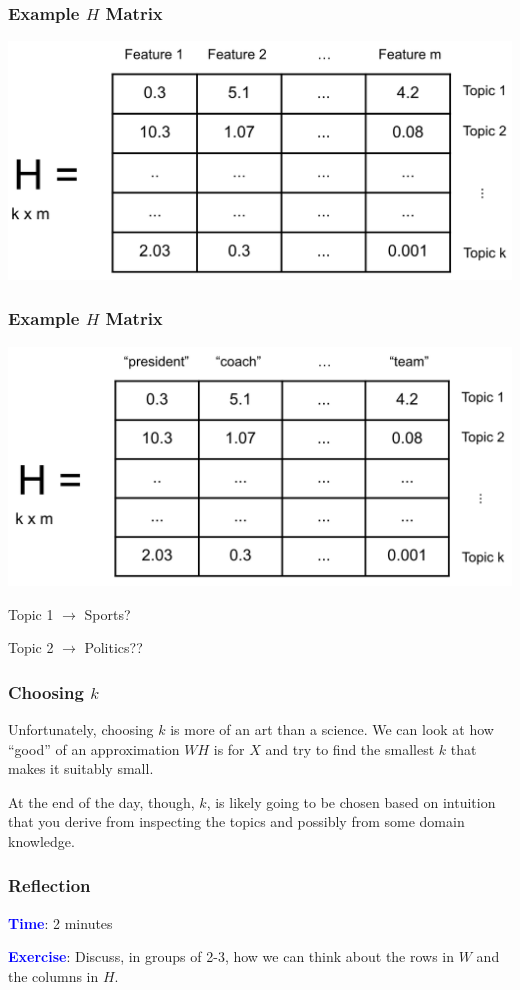 \documentclass{beamer}
\begin{document}
\begin{frame}
  \frametitle{Example $H$ Matrix}
  \includegraphics[width=\textwidth]{images/h_matrix.png}
\end{frame}

\begin{frame}
  \frametitle{Example $H$ Matrix}
  \includegraphics[width=\textwidth]{images/h_topics.png} \vspace{2mm} \pause

  \centering
  Topic 1 $ \rightarrow $ Sports?

  Topic 2 $ \rightarrow $ Politics??
\end{frame}

\begin{frame}
  \frametitle{Choosing $k$}
  Unfortunately, choosing $k$ is more of an art than a science. We can look at how ``good'' of an approximation $WH$ is for $X$ and try to find the smallest $k$ that makes it suitably small. \vspace{4mm}

  At the end of the day, though, $k$, is likely going to be chosen based on intuition that you derive from inspecting the topics and possibly from some domain knowledge.
\end{frame}

\begin{frame}
  \frametitle{Reflection}
    \textbf{\textcolor{blue}{Time}}: 2 minutes \vspace{4mm}

    \textbf{\textcolor{blue}{Exercise}}: Discuss, in groups of 2-3, how we can think about the rows in $W$ and the columns in $H$.
\end{frame}
\end{document}
